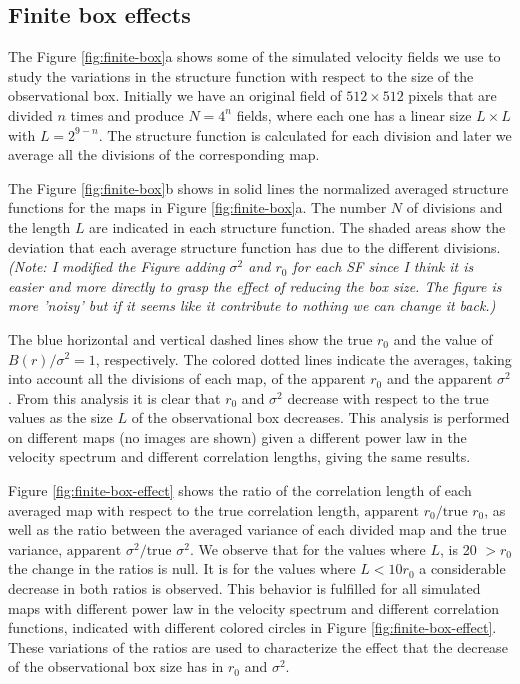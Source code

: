\documentclass[fleqn,usenatbib, useAMS, a4paper]{mnras}
\begin{document}
\subsection{Finite box effects}
\label{sec:finite-box-effects}

The Figure \ref{fig:finite-box}a shows some of the simulated velocity fields we use to study the variations in the structure function with respect to the size of the observational box.
Initially we have an original field of \(512 \times 512 \) pixels that are divided \(n\) times and produce \(N = 4^n\) fields, where each one has a linear size \(L \times L \) with \(L = 2^{9 -n}\).
The structure function is calculated for each division and later we average all the divisions of the corresponding map. 

The Figure \ref{fig:finite-box}b shows in solid lines the normalized averaged structure functions for the maps in Figure \ref{fig:finite-box}a.
The number \(N\) of divisions and the length \(L\) are indicated in each structure function.
The shaded areas show the deviation that each average structure function has due to the different divisions. 
\textit{(Note: I modified the Figure adding \(\sigma^2\) and \(r_0\) for each SF since I think it is easier and more directly to grasp the effect of reducing the box size. The figure is more 'noisy' but if it seems like it contribute to nothing we can change it back.)}

The blue horizontal and vertical dashed lines show the true \(r_{0}\) and the value of \(B(r) / \sigma^2 = 1 \), respectively.
The colored dotted lines indicate the averages, taking into account all the divisions of each map, of the apparent \(r_ {0}\) and the apparent \(\sigma^2 \).
From this analysis it is clear that \(r_0\) and \(\sigma^ 2 \) decrease with respect to the true values as the size \(L\) of the observational box decreases. 
This analysis is performed on different maps (no images are shown) given a different power law in the velocity spectrum and different correlation lengths, giving the same results. 

Figure \ref{fig:finite-box-effect} shows the ratio of the correlation length of each averaged map with respect to the true correlation length, \(\text{apparent } r_ 0 /\text{true } r_0 \), as well as the ratio between the averaged variance of each divided map and the true variance, \(\text{apparent } \sigma^2  / \text{true } \sigma^2\).
We observe that for the values where \(L\), is 20 $> r_0 $ the change in the ratios is null.
It is for the values where \( L < 10 r_0 \) a considerable decrease in both ratios is observed.
This behavior is fulfilled for all simulated maps with different power law in the velocity spectrum and different correlation functions, indicated with different colored circles in Figure \ref{fig:finite-box-effect}. 
These variations of the ratios are used to characterize the effect that the decrease of the observational box size has in \(r_0\) and \(\sigma^2\).
\end{document}
